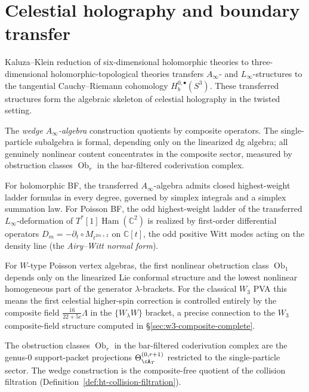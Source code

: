 \section{Celestial holography and boundary transfer}
\label{subsec:celestial-boundary-transfer}

Kaluza--Klein reduction of six-dimensional holomorphic theories to
three-dimensional holomorphic-topological theories transfers
$A_\infty$- and $L_\infty$-structures to the tangential Cauchy--Riemann
cohomology $H_b^{0,\bullet}(S^3)$. These transferred structures form
the algebraic skeleton of celestial holography in the twisted setting.

The \emph{wedge $A_\infty$-algebra} construction quotients by
composite operators. The single-particle subalgebra is formal,
depending only on the linearized dg algebra; all genuinely
nonlinear content concentrates in the composite sector, measured by
obstruction classes $\operatorname{Ob}_r$ in the bar-filtered
coderivation complex.

For holomorphic BF, the transferred $A_\infty$-algebra admits closed
highest-weight ladder formulas in every degree, governed by simplex
integrals and a simplex summation law. For Poisson BF, the
odd highest-weight ladder of the transferred $L_\infty$-deformation of
$T^*[1]\operatorname{Ham}(\mathbb{C}^2)$ is realized by
first-order differential operators
$D_m = -\partial_t \circ M_{t^{2m+2}}$ on $\mathbb{C}[t]$, the
odd positive Witt modes acting on the density line (the
\emph{Airy--Witt normal form}).

For $W$-type Poisson vertex algebras, the first nonlinear
obstruction class $\operatorname{Ob}_1$ depends only on the linearized
Lie conformal structure and the lowest nonlinear homogeneous part of
the generator $\lambda$-brackets. For the classical $W_3$ PVA this
means the first celestial higher-spin correction is controlled entirely
by the composite field $\frac{16}{22+5c}\Lambda$ in the
$\{W_\lambda W\}$ bracket, a precise connection to the $W_3$
composite-field structure computed in
\S\ref{sec:w3-composite-complete}.

\begin{remark}
\label{rem:ht-celestial-obstruction-convolution}
The obstruction classes $\operatorname{Ob}_r$ in the bar-filtered
coderivation complex are the genus-$0$ support-packet projections
$\Theta_{\cA_T}^{(0,r+1)}$ restricted to the single-particle
sector. The wedge construction is the composite-free quotient of the
collision filtration
(Definition~\ref{def:ht-collision-filtration}).
\end{remark}

